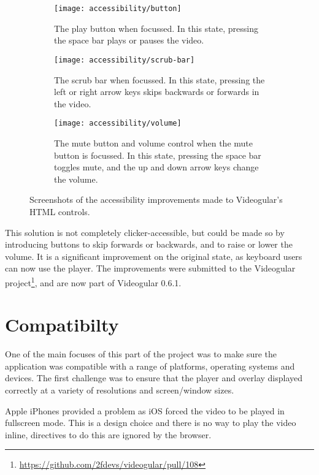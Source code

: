 \begin{figure}
	\begin{subfigure}[]{\textwidth}
		\texttt{[image: accessibility/button]}
		\caption{The play button when focussed. In this state, pressing the space bar plays or pauses the video.}
		\label{Figure:Accessibility/Screenshots/Button}
	\end{subfigure}
	\begin{subfigure}[]{\textwidth}
		\texttt{[image: accessibility/scrub-bar]}
		\caption{The scrub bar when focussed. In this state, pressing the left or right arrow keys skips backwards or forwards in the video.}
		\label{Figure:Accessibility/Screenshots/ScrubBar}
	\end{subfigure}
	\begin{subfigure}[]{\textwidth}
		\texttt{[image: accessibility/volume]}
		\caption{The mute button and volume control when the mute button is focussed. In this state, pressing the space bar toggles mute, and the up and down arrow keys change the volume.}
		\label{Figure:Accessibility/Screenshots/Volume}
	\end{subfigure}
	\caption{Screenshots of the accessibility improvements made to Videogular's HTML controls.}
	\label{Figure:Accessibility/Screenshots}
\end{figure}

This solution is not completely clicker-accessible, but could be made so by introducing buttons to skip forwards or backwards, and to raise or lower the volume. It is a significant improvement on the original state, as keyboard users can now use the player. The improvements were submitted to the Videogular project\footnote{\url{https://github.com/2fdevs/videogular/pull/108}}, and are now part of Videogular 0.6.1.

\section{Compatibilty} 
\label{Section:Compatibility}

One of the main focuses of this part of the project was to make sure the application was compatible with a range of platforms, operating systems and devices. The first challenge was to ensure that the player and overlay displayed correctly at a variety of resolutions and screen/window sizes. 

Apple iPhones provided a problem as iOS forced the video to be played in fullscreen mode. This is a design choice and there is no way to play the video inline, directives to do this are ignored by the browser.

